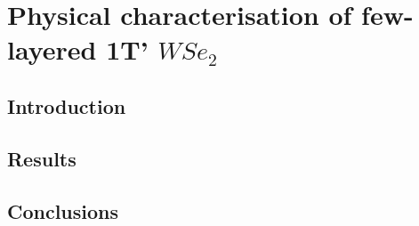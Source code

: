 \chapter{Physical characterisation of few-layered 1T' $WSe_2$}

\section{Introduction}



\section{Results}



\section{Conclusions}

